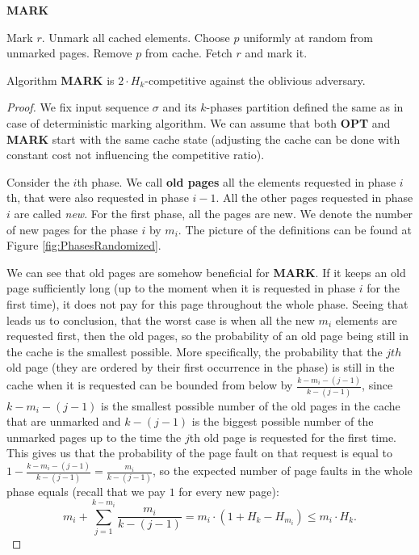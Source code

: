 \begin{algorithm}
\caption{\textbf{MARK}}
\label{alg:MARK}
\begin{algorithmic}[1]
    \State Mark $r$.
  \Else
	\State Unmark all cached elements.
      \EndIf
      \State Choose $p$ uniformly at random from unmarked pages.
      \State Remove $p$ from cache.
    \EndIf
    \State Fetch $r$ and mark it.
  \EndIf
\EndFor
\end{algorithmic}
\end{algorithm}
\begin{theorem}
\cite{markcom} Algorithm \textbf{MARK} is $2 \cdot H_k$-competitive against the oblivious 
adversary.
\end{theorem}
\begin{proof}
We fix input sequence $\sigma$ and its $k$-phases partition defined the same as 
in case of deterministic marking algorithm. We can assume that both 
\textbf{OPT} and \textbf{MARK} start with the same cache state (adjusting the 
cache can be done with constant cost not influencing the competitive ratio).

Consider the $i$th phase. We call \textbf{old pages} all the elements requested 
in 
phase $i$th, that were also requested in phase $i-1$. All the other pages requested 
in phase $i$ are called \textit{new}. For the first phase, all the pages are new. We 
denote the number of new pages for the phase $i$ by $m_i$. The picture of the 
definitions can be found at Figure \ref{fig:PhasesRandomized}.


We can see that old pages are somehow beneficial for \textbf{MARK}. If it keeps 
an old page sufficiently long (up to the moment when it is requested 
in phase $i$ for the first time), it does not pay for this page throughout the whole phase. Seeing that 
leads us to conclusion, that the worst case is when all the new 
$m_i$ elements are requested first, then the old pages, so the probability of an old 
page being still in the cache is the smallest possible. More specifically, the 
probability that the $jth$ old page (they are ordered by their first 
occurrence in the phase) is still in the cache when it is requested can be bounded from below by 
$\frac{k-m_i-(j-1)}{k-(j-1)}$, since $k-m_i-(j-1)$ is the smallest possible number of the old pages in 
the cache that are unmarked and  $k-(j-1)$ is the biggest possible number of the unmarked pages 
up to the time the $j$th old page is requested for the first time. This gives us that 
the probability of the page fault on that request is equal to $1 - 
\frac{k-m_i-(j-1)}{k-(j-1)} = \frac{m_i}{k-(j-1)}$, so the expected number of 
page faults in the whole phase equals (recall that we pay $1$ for every new page):
$$ m_i + \sum_{j=1}^{k - m_i}\frac{m_i}{k-(j-1)} = m_i\cdot(1+H_k-H_{m_i}) \leq 
m_i \cdot H_k.$$


\end{proof}
